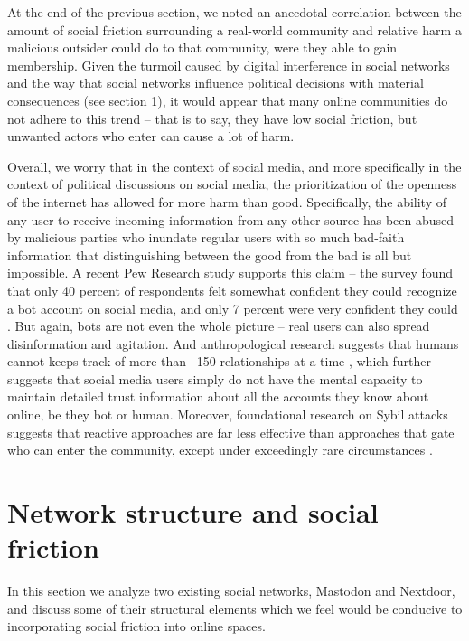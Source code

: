 \documentclass[sigconf,authordraft]{acmart}
\begin{document}
At the end of the previous section, we noted an anecdotal correlation between the amount of social friction surrounding a real-world community and relative harm a malicious outsider could do to that community, were they able to gain membership. Given the turmoil caused by digital interference in social networks and the way that social networks influence political decisions with material consequences (see section 1), it would appear that many online communities do not adhere to this trend -- that is to say, they have low social friction, but unwanted actors who enter can cause a lot of harm. 

Overall, we worry that in the context of social media, and more specifically in the context of political discussions on social media, the prioritization of the openness of the internet has allowed for more harm than good. Specifically, the ability of any user to receive incoming information from any other source has been abused by malicious parties who inundate regular users with so much bad-faith information that distinguishing between the good from the bad is all but impossible. A recent Pew Research study supports this claim -- the survey found that only 40 percent of respondents felt somewhat confident they could recognize a bot account on social media, and only 7 percent were very confident they could \cite{PewBotStudy}. But again, bots are not even the whole picture -- real users can also spread disinformation and agitation. And anthropological research suggests that humans cannot keeps track of more than ~150 relationships at a time \cite{zhou2005discrete}, which further suggests that social media users simply do not have the mental capacity to maintain detailed trust information about all the accounts they know about online, be they bot or human. Moreover, foundational research on Sybil attacks suggests that reactive approaches are far less effective than approaches that gate who can enter the community, except under exceedingly rare circumstances \cite{douceur2002sybil}.




\section{Network structure and social friction}

In this section we analyze two existing social networks, Mastodon and Nextdoor, and discuss some of their structural elements which we feel would be conducive to incorporating social friction into online spaces.
\end{document}
